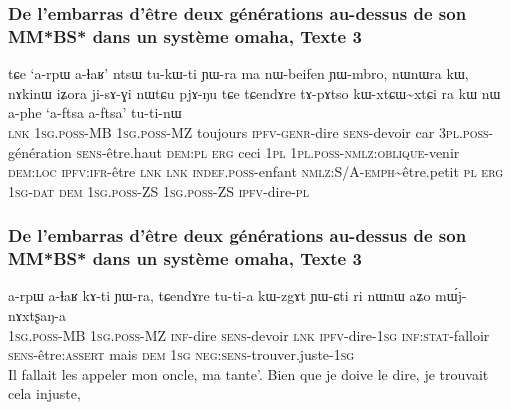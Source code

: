 \documentclass[xcolor=table]{beamer}
\newcommand{\tld}{\textasciitilde{}}
\newcommand{\ipa}[1]{{\phon #1}} %
\begin{document}
  \begin{frame} 
 \frametitle{De l'embarras d'être deux générations au-dessus de son MM*BS* dans un système omaha, Texte 3} 
 \begin{exe}
\ex 
\gll 
\ipa{tɕe} 	`\ipa{a-rpɯ} 	\ipa{a-ɬaʁ}' 	\ipa{ntsɯ} 	\ipa{tu-kɯ-ti} 	\ipa{ɲɯ-ra} 	\ipa{ma} 	\ipa{nɯ-}beifen 	\ipa{ɲɯ-mbro,} 	\ipa{nɯnɯra} 	\ipa{kɯ,} 	\ipa{nɤkinɯ} 	\ipa{iʑora} 	\ipa{ji-sɤ-ɣi} 	\ipa{nɯtɕu} 	\ipa{pjɤ-ŋu} 	\ipa{tɕe}  \ipa{tɕendɤre} 	\ipa{tɤ-pɤtso} 	\ipa{kɯ-xtɕɯ\tld{}xtɕi} 	\ipa{ra} 	\ipa{kɯ} 	\ipa{nɯ} 	\ipa{a-phe} `\ipa{a-ftsa} 	\ipa{a-ftsa}' 	\ipa{tu-ti-nɯ}\\
\textsc{lnk} \textsc{1sg.poss}-MB  \textsc{1sg.poss}-MZ toujours \textsc{ipfv-genr}-dire \textsc{sens}-devoir car \textsc{3pl.poss}-génération \textsc{sens}-être.haut \textsc{dem:pl} \textsc{erg} ceci \textsc{1pl} \textsc{1pl.poss-nmlz:oblique}-venir \textsc{dem:loc} \textsc{ipfv:ifr}-être \textsc{lnk}  \textsc{lnk} \textsc{indef.poss}-enfant  \textsc{nmlz:S/A-emph}\tld{}être.petit \textsc{pl} \textsc{erg} \textsc{1sg-dat} \textsc{dem} \textsc{1sg.poss}-ZS \textsc{1sg.poss}-ZS \textsc{ipfv}-dire-\textsc{pl} \\ 
\end{exe}
\end{frame}


  \begin{frame} 
 \frametitle{De l'embarras d'être deux générations au-dessus de son MM*BS* dans un système omaha, Texte 3} 
  \begin{exe}
\ex 
\gll 
\ipa{a-rpɯ} 	\ipa{a-ɬaʁ} 	\ipa{kɤ-ti} 	\ipa{ɲɯ-ra,} 	\ipa{tɕendɤre} 	\ipa{tu-ti-a} 	\ipa{kɯ-zgɤt} 	\ipa{ɲɯ-ɕti} 	\ipa{ri} 	\ipa{nɯnɯ} 	\ipa{aʑo} 	\ipa{mɯ́j-nɤxtʂaŋ-a} \\
\textsc{1sg.poss}-MB \textsc{1sg.poss}-MZ \textsc{inf}-dire \textsc{sens}-devoir \textsc{lnk} \textsc{ipfv}-dire-\textsc{1sg} \textsc{inf:stat}-falloir \textsc{sens}-être:\textsc{assert} mais \textsc{dem} \textsc{1sg} \textsc{neg:sens}-trouver.juste-\textsc{1sg} \\
\glt Il fallait les appeler  mon oncle, ma tante'. Bien que je doive le dire, je trouvait cela injuste,
\end{exe}
\end{frame}
\end{document}
